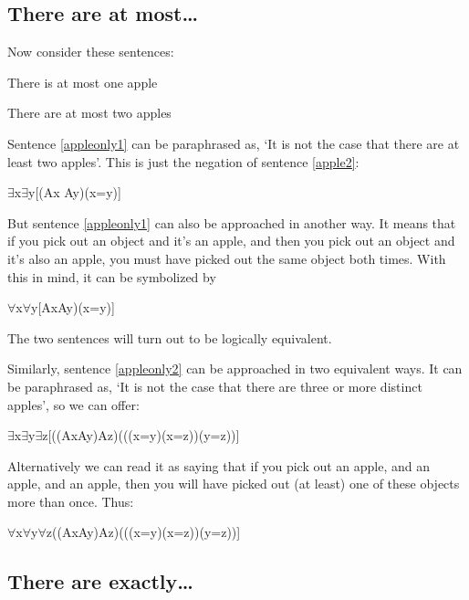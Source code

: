 \subsection{
There are at most\ldots
}
Now consider these sentences:
\begin{earg}
\item[\ex{appleonly1}] There is at most one apple
\item[\ex{appleonly2}] There are at most two apples
\end{earg}
Sentence \ref{appleonly1} can be paraphrased as, ‘It is not the case that there are at least two apples’. This is just the negation of sentence \ref{apple2}:
\begin{center}
\enot $\exists$x$\exists$y[(Ax \eand Ay)\eand \enot (x=y)]
\end{center}
But sentence \ref{appleonly1} can also be approached in another way. It means that if you pick out an object and it’s an apple, and then you pick out an object and it’s also an apple, you must have picked out the same object both times. With this in mind, it can be symbolized by
\begin{center}
$\forall$x$\forall$y[Ax\eand Ay)\eif (x=y)]
\end{center}
The two sentences will turn out to be logically equivalent.

Similarly, sentence \ref{appleonly2} can be approached in two equivalent ways. It can be paraphrased as, ‘It is not the case that there are three or more distinct apples’, so we can offer:
\begin{center}
\enot $\exists$x$\exists$y$\exists$z[((Ax\eand Ay)\eand Az)\eand ((\enot (x=y)\eand \enot (x=z))\eand \enot (y=z))]
\end{center}
Alternatively we can read it as saying that if you pick out an apple, and an apple, and an apple, then you will have picked out (at least) one of these objects more than once. Thus:
\begin{center}
$\forall$x$\forall$y$\forall$z((Ax\eand Ay)\eand Az)\eif (((x=y)\eor (x=z))\eor (y=z))]
\end{center}
\subsection{There are exactly\ldots}

